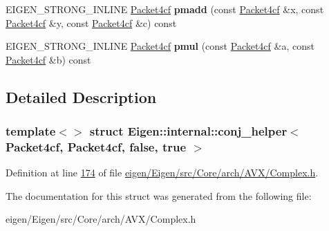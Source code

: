 \begin{DoxyCompactItemize}
E\+I\+G\+E\+N\+\_\+\+S\+T\+R\+O\+N\+G\+\_\+\+I\+N\+L\+I\+NE \hyperlink{struct_eigen_1_1internal_1_1_packet4cf}{Packet4cf} {\bfseries pmadd} (const \hyperlink{struct_eigen_1_1internal_1_1_packet4cf}{Packet4cf} \&x, const \hyperlink{struct_eigen_1_1internal_1_1_packet4cf}{Packet4cf} \&y, const \hyperlink{struct_eigen_1_1internal_1_1_packet4cf}{Packet4cf} \&c) const
\item 
\mbox{\label{struct_eigen_1_1internal_1_1conj__helper_3_01_packet4cf_00_01_packet4cf_00_01false_00_01true_01_4_a19ff6d80791dd7ee3efa068187c4f6d4}} 
E\+I\+G\+E\+N\+\_\+\+S\+T\+R\+O\+N\+G\+\_\+\+I\+N\+L\+I\+NE \hyperlink{struct_eigen_1_1internal_1_1_packet4cf}{Packet4cf} {\bfseries pmul} (const \hyperlink{struct_eigen_1_1internal_1_1_packet4cf}{Packet4cf} \&a, const \hyperlink{struct_eigen_1_1internal_1_1_packet4cf}{Packet4cf} \&b) const
\end{DoxyCompactItemize}


\subsection{Detailed Description}
\subsubsection*{template$<$$>$\newline
struct Eigen\+::internal\+::conj\+\_\+helper$<$ Packet4cf, Packet4cf, false, true $>$}



Definition at line \hyperlink{eigen_2_eigen_2src_2_core_2arch_2_a_v_x_2_complex_8h_source_l00174}{174} of file \hyperlink{eigen_2_eigen_2src_2_core_2arch_2_a_v_x_2_complex_8h_source}{eigen/\+Eigen/src/\+Core/arch/\+A\+V\+X/\+Complex.\+h}.



The documentation for this struct was generated from the following file\+:\begin{DoxyCompactItemize}
\item 
eigen/\+Eigen/src/\+Core/arch/\+A\+V\+X/\+Complex.\+h\end{DoxyCompactItemize}
